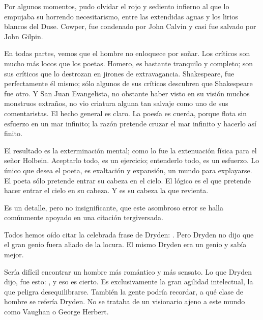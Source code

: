 Por algunos momentos, pudo olvidar el rojo y sediento infierno al que lo empujaba su horrendo
necesitarismo, entre las extendidas aguas y los lirios blancos del Duse. Cowper, fue condenado por 
John Calvin y casi fue salvado por John Gilpin.

En todas partes, vemos que el hombre no enloquece por soñar. Los críticos son mucho más locos
que los poetas. Homero, es bastante tranquilo y completo; son sus críticos que lo destrozan en jirones de
extravagancia. Shakespeare, fue perfectamente él mismo; sólo algunos de sus críticos descubren que
Shakespeare fue otro. Y San Juan Evangelista, no obstante haber visto en su visión muchos monstruos
extraños, no vio criatura alguna tan salvaje como uno de sus comentaristas. El hecho general es claro. La
poesía es cuerda, porque flota sin esfuerzo en un mar infinito; la razón pretende cruzar el mar infinito y
hacerlo así finito.

El resultado es la exterminación mental; como lo fue la extenuación física para el señor Holbein.
Aceptarlo todo, es un ejercicio; entenderlo todo, es un esfuerzo. Lo único que desea el poeta, es
exaltación y expansión, un mundo para explayarse.
El poeta sólo pretende entrar su cabeza en el cielo.
El lógico es el que pretende hacer entrar el cielo en su cabeza. Y es su cabeza la que revienta.

Es un detalle, pero no insignificante, que este asombroso error se halla comúnmente apoyado en una
citación tergiversada.

Todos hemos oído citar la celebrada frase de Dryden: . Pero
Dryden no dijo que el gran genio fuera aliado de la locura. El mismo Dryden era un genio y sabía mejor.

Sería difícil encontrar un hombre más romántico y más sensato. Lo que Dryden dijo, fue esto: , y eso es cierto. Es exclusivamente la gran agilidad
intelectual, la que peligra desequilibrarse. También la gente podría recordar, a qué clase de hombre se
refería Dryden. No se trataba de un visionario ajeno a este mundo como Vaughan o George Herbert.

